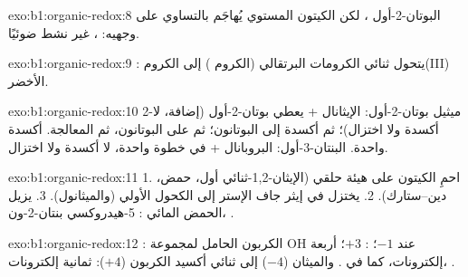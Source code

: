 \begin{solution}{exo:b1:organic-redox:8}
البوتان-2-أول ، لكن الكيتون المستوي يُهاجَم بالتساوي على
وجهيه: ، غير نشط ضوئيًا.
\end{solution}

\begin{solution}{exo:b1:organic-redox:9}
: يتحول ثنائي الكرومات
البرتقالي (الكروم ) إلى الكروم(III) الأخضر.
\end{solution}

\begin{solution}{exo:b1:organic-redox:10}
2-ميثيل بوتان-2-أول: الإيثانال +  يعطي بوتان-2-أول (إضافة،
لا أكسدة ولا اختزال)؛ ثم أكسدة إلى البوتانون؛ ثم  على البوتانون،
ثم المعالجة. أكسدة واحدة. البنتان-3-أول: البروبانال +  في
خطوة واحدة، لا أكسدة ولا اختزال.
\end{solution}

\begin{solution}{exo:b1:organic-redox:11}
1. احمِ الكيتون على هيئة  حلقي (الإيثان-1,2-ثنائي أول، حمض،
دين--ستارك). 2. يختزل  في إيثر جاف الإستر إلى
الكحول الأولي (والميثانول). 3. يزيل الحمض المائي :
5-هيدروكسي بنتان-2-ون، .
\end{solution}

\begin{solution}{exo:b1:organic-redox:12}
: الكربون الحامل لمجموعة OH عند $-1$؛ : $+3$؛ أربعة إلكترونات، كما في
. والميثان ($-4$) إلى ثنائي أكسيد الكربون
($+4$): ثمانية إلكترونات، .
\end{solution}

